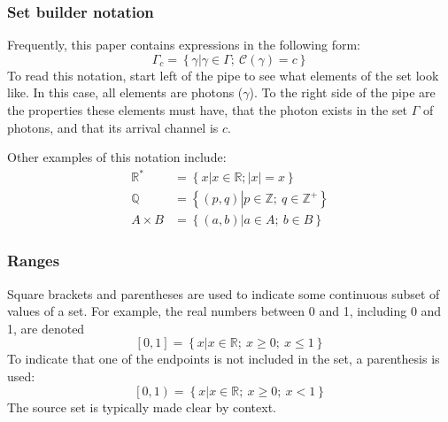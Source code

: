 \documentclass{article}
\newcommand{\braces}[1]{\ensuremath{\left\lbrace #1 \right\rbrace}}
\newcommand{\brackets}[1]{\ensuremath{\left[ #1 \right]}}
\newcommand{\setbuilder}[2]{\ensuremath{\braces{#1 \left| #2 \right.}}}
\newcommand{\integers}{\ensuremath{\mathbb{Z}}}
\newcommand{\reals}{\ensuremath{\mathbb{R}}}
\newcommand{\rationals}{\ensuremath{\mathbb{Q}}}
\newcommand{\abs}[1]{\ensuremath{\left|#1\right|}}
\newcommand{\channel}{\ensuremath{c}}
\newcommand{\Channel}{\ensuremath{\mathcal{C}}}
\newcommand{\photon}{\ensuremath{\gamma}}
\newcommand{\photons}{\ensuremath{\Gamma}}
\begin{document}
\begin{appendix}
\subsubsection{Set builder notation}
Frequently, this paper contains expressions in the following form:
\begin{equation}
\photons_{\channel}=\braces{\photon\left|\photon\in\photons;~\Channel(\photon)=\channel\right.}
\end{equation}
To read this notation, start left of the pipe to see what elements of the set look like. In this case, all elements are photons (\photon). To the right side of the pipe are the properties these elements must have, that the photon exists in the set \photons{} of photons, and that its arrival channel is $c$. 

Other examples of this notation include:
\begin{align}
\reals^{*} &= \setbuilder{x}
                        {x\in\reals; \abs{x}=x} \\
\rationals &= \setbuilder{(p,q)}
                        {p\in\integers;~q\in\integers^{+}} \\
A\times B &= \setbuilder{(a,b)}
                       {a\in A;~b\in B}                       
\end{align}

\subsubsection{Ranges}
Square brackets and parentheses are used to indicate some continuous subset of values of a set. For example, the real numbers between 0 and 1, including 0 and 1, are denoted
\begin{equation}
\brackets{0,1} = \setbuilder{x}{x\in\reals;~x\ge 0;~x\le 1}
\end{equation}
To indicate that one of the endpoints is not included in the set, a parenthesis is used:
\begin{equation}
\left[0,1\right) = \setbuilder{x}{x\in\reals;~x\ge 0;~x<1}
\end{equation}
The source set is typically made clear by context.


\end{appendix}
\end{document}
